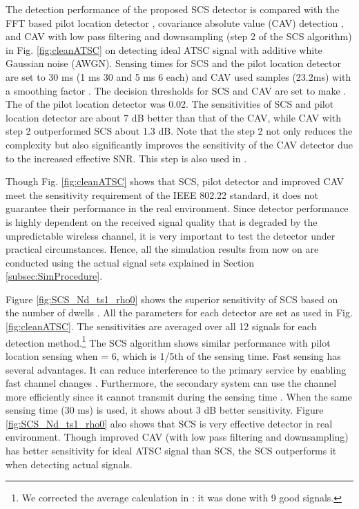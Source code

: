 \documentclass[draftclsnofoot,onecolumn,12pt]{IEEEtran}
\begin{document}
The detection performance of the proposed SCS detector is compared with the FFT based pilot location detector \cite{CorGho07}, covariance absolute value (CAV) detection \cite{ZenLia09}, and CAV with low pass filtering and downsampling (step 2 of the SCS algorithm) in Fig. \ref{fig:cleanATSC} on detecting ideal ATSC signal with additive white Gaussian noise (AWGN). Sensing times for SCS and the pilot location detector are set to 30 ms (1 ms  30 and 5 ms  6 each) and CAV used   samples (23.2ms) with a smoothing factor .
The decision thresholds for SCS and CAV are set to make . The  of the pilot location detector was 0.02.
The sensitivities of SCS and pilot location detector are about 7 dB better than that of the CAV, while CAV with step 2
outperformed SCS about 1.3 dB. 
Note that the step 2 not only reduces the complexity but also significantly improves the sensitivity of the CAV detector due to the increased effective SNR. This step is also used in \cite{CorGho07}.

Though Fig. \ref{fig:cleanATSC} shows that SCS, pilot detector and improved CAV meet the sensitivity requirement of the IEEE 802.22 standard, it does not guarantee their performance in the real environment.
Since detector performance is highly dependent on the received signal quality that is degraded by the unpredictable wireless channel, it is very important to test the detector under practical circumstances.
Hence, all the simulation results from now on are conducted using the actual signal sets explained in Section \ref{subsec:SimProcedure}.

Figure \ref{fig:SCS_Nd_ts1_rho0} shows the superior sensitivity of SCS based on the number of dwells .
All the parameters for each detector are set as used in Fig. \ref{fig:cleanATSC}.
The sensitivities are averaged over all 12 signals for each detection method.\footnote{We corrected the average calculation in \cite{CorGho07}: it was done with 9 good signals.}
The SCS algorithm shows similar performance with pilot location sensing when  = 6, which is 1/5th of the sensing time.
Fast sensing has several advantages. It can reduce interference to the primary service by enabling fast channel changes \cite{YucArs09}.
Furthermore, the secondary system can use the channel more efficiently since it cannot transmit during the sensing time \cite{CorCha06}.
When the same sensing time (30 ms) is used, it shows about 3 dB better sensitivity.
Figure \ref{fig:SCS_Nd_ts1_rho0} also shows that SCS is very effective detector in real environment. Though improved CAV (with low pass filtering and downsampling) has better sensitivity for ideal ATSC signal than SCS, the SCS outperforms it when detecting actual signals.
\end{document}
